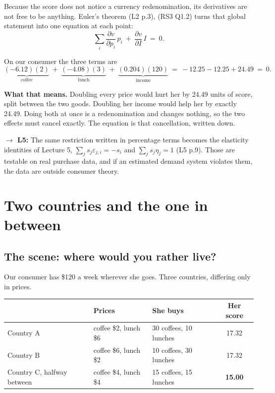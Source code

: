 \documentclass[11pt,letterpaper]{article}
\theoremstyle{definition}
\theoremstyle{plain}
\newcommand{\src}[1]{{\small\textsf{(#1)}}}
\newcommand{\fwd}[1]{\textsf{\textbf{$\rightarrow$ #1:}}}
\begin{document}
Because the score does not notice a currency redenomination, its derivatives are not free to be
anything. Euler's theorem \src{L2 p.3}, \src{RS3 Q1.2} turns that global statement into one equation
at each point:
\begin{equation} \label{eq:eulerv}
\sum_{i} \frac{\partial v}{\partial p_i} \, p_i \ + \ \frac{\partial v}{\partial I} \, I \ = \ 0 .
\end{equation}

On our consumer the three terms are
\[
\underbrace{(-6.12)(2)}_{\text{coffee}} \ + \ \underbrace{(-4.08)(3)}_{\text{lunch}} \ + \
\underbrace{(0.204)(120)}_{\text{income}}
\ = \ -12.25 - 12.25 + 24.49 \ = \ 0 .
\]

\textbf{What that means.} Doubling every price would hurt her by 24.49 units of score, split between
the two goods. Doubling her income would help her by exactly 24.49. Doing both at once is a
redenomination and changes nothing, so the two effects must cancel exactly. The equation is that
cancellation, written down.

\fwd{L5} The same restriction written in percentage terms becomes the elasticity identities of
Lecture 5, $\sum_j s_j \varepsilon_{j,i} = -s_i$ and $\sum_j s_j \eta_j = 1$ \src{L5 p.9}. Those are
testable on real purchase data, and if an estimated demand system violates them, the data are outside
consumer theory.
\section{Two countries and the one in between}
\label{sec:q3}

\subsection{The scene: where would you rather live?}

Our consumer has \$120 a week wherever she goes. Three countries, differing only in prices.

\begin{center}
\begin{tabular}{@{}lllc@{}}
\toprule
 & \textbf{Prices} & \textbf{She buys} & \textbf{Her score} \\
\midrule
Country A & coffee \$2, lunch \$6 & 30 coffees, 10 lunches & 17.32 \\
Country B & coffee \$6, lunch \$2 & 10 coffees, 30 lunches & 17.32 \\
Country C, halfway between & coffee \$4, lunch \$4 & 15 coffees, 15 lunches & \textbf{15.00} \\
\bottomrule
\end{tabular}
\end{center}
\end{document}
